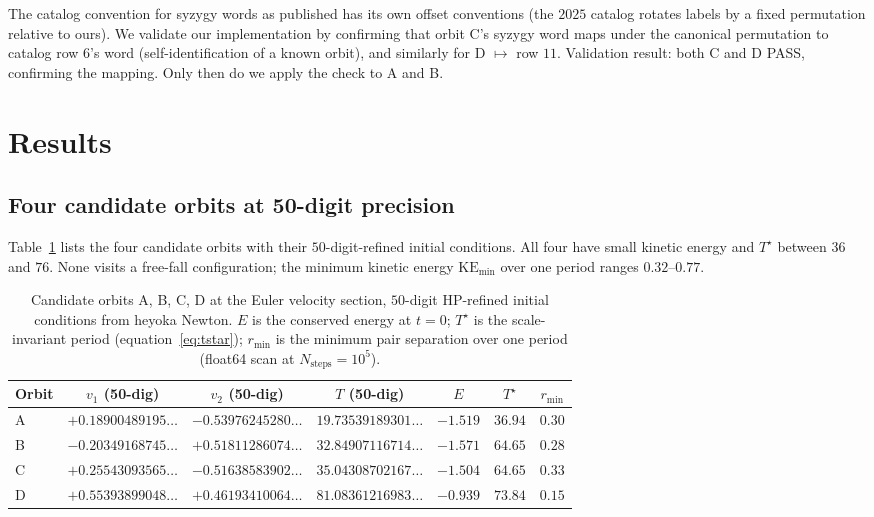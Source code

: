 \documentclass[11pt]{article}
\newcommand{\Tstar}{T^{\star}}
\begin{document}
The catalog convention for syzygy words as published has its own
offset conventions (the $2025$ catalog rotates labels by a fixed
permutation relative to ours). We validate our implementation by
confirming that orbit C's syzygy word maps under the canonical
permutation to catalog row $6$'s word (self-identification of a known
orbit), and similarly for D $\mapsto$ row $11$. Validation result:
both C and D PASS, confirming the mapping. Only then do we apply the
check to A and B.

\section{Results}
\label{sec:results}

\subsection{Four candidate orbits at 50-digit precision}

Table~\ref{tab:hp-ic} lists the four candidate orbits with their
$50$-digit-refined initial conditions. All four have small kinetic
energy and $\Tstar$ between $36$ and $76$. None visits a free-fall
configuration; the minimum kinetic energy $\mathrm{KE}_{\min}$ over
one period ranges $0.32$--$0.77$.

\begin{table}[tb]
\centering
\caption{Candidate orbits A, B, C, D at the Euler velocity section,
$50$-digit HP-refined initial conditions from heyoka Newton. $E$ is
the conserved energy at $t=0$; $\Tstar$ is the scale-invariant
period (equation~\ref{eq:tstar}); $r_{\min}$ is the minimum pair
separation over one period (float64 scan at $N_{\text{steps}} = 10^5$).}
\label{tab:hp-ic}
\footnotesize
\begin{tabular}{lcccccc}
\toprule
Orbit & $v_1$ (50-dig) & $v_2$ (50-dig) & $T$ (50-dig) & $E$ & $\Tstar$ & $r_{\min}$ \\
\midrule
A & $+0.18900489195\ldots$ & $-0.53976245280\ldots$ & $19.73539189301\ldots$ & $-1.519$ & $36.94$ & $0.30$\\
B & $-0.20349168745\ldots$ & $+0.51811286074\ldots$ & $32.84907116714\ldots$ & $-1.571$ & $64.65$ & $0.28$\\
C & $+0.25543093565\ldots$ & $-0.51638583902\ldots$ & $35.04308702167\ldots$ & $-1.504$ & $64.65$ & $0.33$\\
D & $+0.55393899048\ldots$ & $+0.46193410064\ldots$ & $81.08361216983\ldots$ & $-0.939$ & $73.84$ & $0.15$\\
\bottomrule
\end{tabular}
\end{table}
\end{document}
